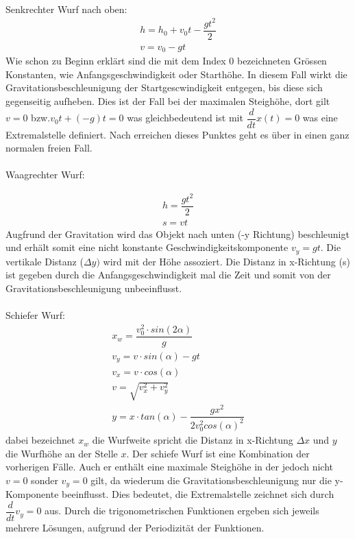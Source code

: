 \documentclass[12pt]{article}
\begin{document}
\\ Senkrechter Wurf nach oben:
\begin{equation}
\begin{split}
h = h_0 + v_0t-\dfrac{gt^2}{2} \\
v = v_0 - gt
\end{split}
\end{equation}
Wie schon zu Beginn erklärt sind die mit dem Index 0 bezeichneten Grössen Konstanten, wie Anfangsgeschwindigkeit oder Starthöhe. In diesem Fall wirkt die Gravitationsbeschleunigung der Startgescwindigkeit entgegen, bis diese sich gegenseitig aufheben. Dies ist der Fall bei der maximalen Steighöhe, dort gilt $v=0$ bzw.$ v_0t + (-g)t = 0$ was gleichbedeutend ist mit $\dfrac{d}{dt} x(t) = 0$ was eine Extremalstelle definiert. Nach erreichen dieses Punktes geht es über in einen ganz normalen freien Fall.\\
\\
Waagrechter Wurf:

\begin{equation}
\begin{split}
h = \dfrac{gt^2}{2} \\
s = vt
\end{split}
\end{equation}
Augfrund der Gravitation wird das Objekt nach unten (-y Richtung) beschleunigt und erhält somit eine nicht konstante Geschwindigkeitskomponente $v_y = gt$. Die vertikale Distanz ($\Delta y)$ wird mit der Höhe assoziert. Die Distanz in x-Richtung (s) ist gegeben durch die Anfangsgeschwindigkeit mal die Zeit und somit von der Gravitationsbeschleunigung unbeeinflusst.\\
\\
Schiefer Wurf:
\begin{equation}
\begin{split}
x_w = \dfrac{v_0^2 \cdot sin(2\alpha)}{g} \\
v_y = v \cdot sin(\alpha)-gt \\
v_x = v \cdot cos(\alpha) \\
v = \sqrt{v_x^2 + v_y^2} \\
y = x \cdot tan(\alpha)-\dfrac{gx^2}{2v_0^2cos(\alpha)^2}
\end{split}
\end{equation}
dabei bezeichnet $x_w$ die Wurfweite spricht die Distanz in x-Richtung $\Delta x$ und $y$ die Wurfhöhe an der Stelle $x$.
Der schiefe Wurf ist eine Kombination der vorherigen Fälle. Auch er enthält eine maximale Steighöhe in der jedoch nicht $v = 0$ sonder $v_y = 0$ gilt, da wiederum die Gravitationsbeschleunigung nur die y-Komponente beeinflusst. Dies bedeutet, die Extremalstelle zeichnet sich durch $\dfrac{d}{dt} v_y = 0$ aus. Durch die trigonometrischen Funktionen ergeben sich jeweils mehrere Lösungen, aufgrund der Periodizität der Funktionen.
\end{document}
